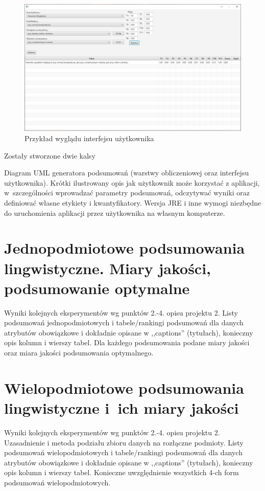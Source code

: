 \documentclass{classrep}
\begin{document}
\begin{figure}[h!]
 \centering
 \includegraphics[width=15cm]{gui.png}
 \vspace{-0.3cm}
 \caption{Przykład wyglądu interfejsu użytkownika}
 \label{gui}
\end{figure}

\newpage

Zostały stworzone dwie kalsy 


Diagram UML generatora podsumowań (warstwy obliczeniowej oraz interfejsu
użytkownika). Krótki ilustrowany opis jak użytkownik może korzystać z aplikacji, w~szczególności
wprowadzać parametry  podsumowań, odczytywać wyniki oraz definiować własne etykiety i
kwantyfikatory. Wersja JRE i inne wymogi niezbędne do uruchomienia aplikacji przez użytkownika na własnym komputerze. \\

\section{ Jednopodmiotowe podsumowania lingwistyczne. Miary jakości, podsumowanie optymalne}
Wyniki kolejnych eksperymentów wg punktów 2.-4. opisu projektu 2.  Listy podsumowań
jednopodmiotowych i tabele/rankingi podsumowań dla danych atrybutów obowiązkowe i dokładnie opisane w ,,captions'' (tytułach), konieczny opis kolumn i wierszy tabel. Dla każdego podsumowania podane miary jakości oraz miara jakości podsumowania
optymalnego.\\



\section{Wielopodmiotowe podsumowania lingwistyczne i~ich miary jakości} 
Wyniki kolejnych eksperymentów wg punktów 2.-4. opisu projektu 2. Uzasadnienie i
metoda podziału zbioru danych na rozłączne podmioty. Listy podsumowań
wielopodmiotowych i tabele/rankingi podsumowań dla danych atrybutów obowiązkowe i
dokładnie opisane w ,,captions'' (tytułach), konieczny opis kolumn i wierszy tabel.
Konieczne uwzględnienie wszystkich 4-ch form podsumowań wielopodmiotowych. 
\\ 
\end{document}
